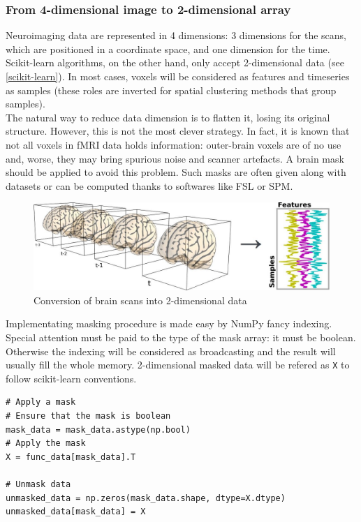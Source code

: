 \documentclass{frontiersSCNS} %
\begin{document}
\subsubsection{From 4-dimensional image to 2-dimensional array}

Neuroimaging data are represented in 4 dimensions: 3 dimensions for the scans,
which are positioned in a coordinate space, and one dimension for the time.
Scikit-learn algorithms, on the other hand, only accept 2-dimensional data (see
\ref{scikit-learn}).
In most cases, voxels will be considered as features and timeseries as samples (these
roles are inverted for spatial clustering methods that group samples).\\

The natural way to reduce data dimension is to flatten it, losing its original
structure. However, this is not the most clever strategy. In fact, it is known
that not all voxels in fMRI data holds information: outer-brain voxels are of no
use and, worse, they may bring spurious noise and scanner artefacts.
A brain mask should be applied to avoid this problem. Such masks
are often given along with datasets or can be computed thanks to softwares like
FSL or SPM.\\

\begin{figure}[hbtp]
    \begin{center}
        \includegraphics[width=.5\linewidth]{img/niimgs.jpg}
    \end{center}
    \caption{Conversion of brain scans into 2-dimensional data}
    \label{fig:niimg}
\end{figure}

Implementating masking procedure is made easy by NumPy fancy
indexing. Special attention must be paid to the type of the mask array: it must
be boolean. Otherwise the indexing will be considered as broadcasting and the
result will usually fill the whole memory.
2-dimensional masked data will be refered as \texttt{X} to follow scikit-learn
conventions.

\begin{lstlisting}
# Apply a mask
# Ensure that the mask is boolean
mask_data = mask_data.astype(np.bool)
# Apply the mask
X = func_data[mask_data].T

# Unmask data
unmasked_data = np.zeros(mask_data.shape, dtype=X.dtype)
unmasked_data[mask_data] = X
\end{lstlisting}
\end{document}
